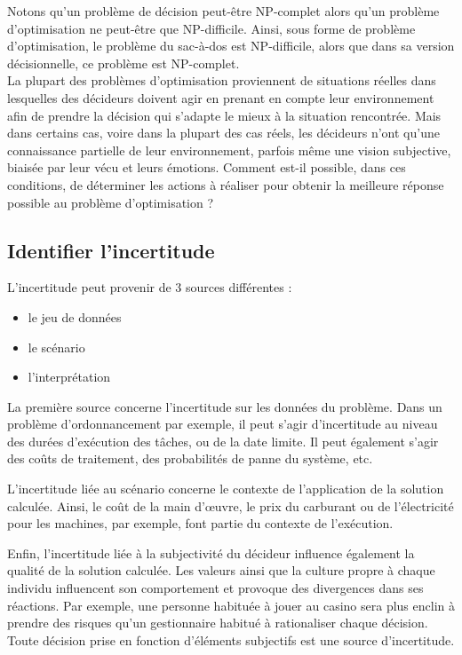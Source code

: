 Notons qu'un problème de décision peut-être NP-complet alors qu'un problème d'optimisation ne peut-être que NP-difficile. Ainsi, sous forme de problème d'optimisation, le problème du sac-à-dos est NP-difficile, alors que dans sa version décisionnelle, ce problème est NP-complet.\\

La plupart des problèmes d'optimisation proviennent de situations réelles dans lesquelles des décideurs doivent agir en prenant en compte leur environnement afin de prendre la décision qui s'adapte le mieux à la situation rencontrée. Mais dans certains cas, voire dans la plupart des cas réels, les décideurs n'ont qu'une connaissance partielle de leur environnement, parfois même une vision subjective, biaisée par leur vécu et leurs émotions. Comment est-il  possible, dans ces conditions, de déterminer les actions à réaliser pour obtenir la meilleure réponse possible au problème d'optimisation ?

\subsection{Identifier l'incertitude}

L'incertitude peut provenir de 3 sources différentes :
\begin{itemize}
  \item le jeu de données
  \item le scénario
  \item l'interprétation
\end{itemize}
La première source concerne l'incertitude sur les données du problème. Dans un problème d'ordonnancement par exemple, il peut s'agir d'incertitude au niveau des durées d'exécution des tâches, ou de la date limite. Il peut également s'agir des coûts de traitement, des probabilités de panne du système, etc.

L'incertitude liée au scénario concerne le contexte de l'application de la solution calculée. Ainsi, le coût de la main d’œuvre, le prix du carburant ou de l'électricité pour les machines, par exemple, font partie du contexte de l'exécution.

Enfin, l'incertitude liée à la subjectivité du décideur influence également la qualité de la solution calculée. Les valeurs ainsi que la culture propre à chaque individu influencent son comportement et provoque des divergences dans ses réactions. Par exemple, une personne habituée à jouer au casino sera plus enclin à prendre des risques qu'un gestionnaire habitué à rationaliser chaque décision. Toute décision prise en fonction d'éléments subjectifs est une source d'incertitude.\\

